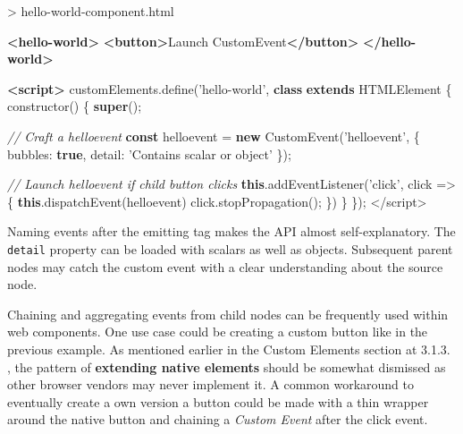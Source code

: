 \documentclass[]{article}
\newenvironment{Shaded}{}{}
\newcommand{\KeywordTok}[1]{\textcolor[rgb]{0.00,0.44,0.13}{\textbf{{#1}}}}
\newcommand{\DataTypeTok}[1]{\textcolor[rgb]{0.56,0.13,0.00}{{#1}}}
\newcommand{\StringTok}[1]{\textcolor[rgb]{0.25,0.44,0.63}{{#1}}}
\newcommand{\SpecialStringTok}[1]{\textcolor[rgb]{0.73,0.40,0.53}{{#1}}}
\newcommand{\CommentTok}[1]{\textcolor[rgb]{0.38,0.63,0.69}{\textit{{#1}}}}
\newcommand{\VariableTok}[1]{\textcolor[rgb]{0.10,0.09,0.49}{{#1}}}
\newcommand{\OperatorTok}[1]{\textcolor[rgb]{0.40,0.40,0.40}{{#1}}}
\newcommand{\AttributeTok}[1]{\textcolor[rgb]{0.49,0.56,0.16}{{#1}}}
\newcommand{\NormalTok}[1]{{#1}}
\begin{document}
\begin{Shaded}
\begin{Highlighting}[]
\NormalTok{> hello-world-component.html}

\KeywordTok{<hello-world>}
 \KeywordTok{<button>}\NormalTok{Launch CustomEvent}\KeywordTok{</button>}
\KeywordTok{</hello-world>}

\KeywordTok{<script>}
 \VariableTok{customElements}\NormalTok{.}\AttributeTok{define}\NormalTok{(}\StringTok{'hello-world'}\OperatorTok{,} 
 \KeywordTok{class} \KeywordTok{extends} \NormalTok{HTMLElement }\OperatorTok{\{}
  \AttributeTok{constructor}\NormalTok{() }\OperatorTok{\{}
    \KeywordTok{super}\NormalTok{()}\OperatorTok{;}
   
   \CommentTok{// Craft a helloevent}
    \KeywordTok{const} \NormalTok{helloevent }\OperatorTok{=} \KeywordTok{new} \AttributeTok{CustomEvent}\NormalTok{(}\StringTok{'helloevent'}\OperatorTok{,} \OperatorTok{\{}
    \DataTypeTok{bubbles}\OperatorTok{:} \KeywordTok{true}\OperatorTok{,}
    \DataTypeTok{detail}\OperatorTok{:} \StringTok{'Contains scalar or object'}
   \OperatorTok{\}}\NormalTok{)}\OperatorTok{;}
   
   \CommentTok{// Launch helloevent if child button clicks}
   \KeywordTok{this}\NormalTok{.}\AttributeTok{addEventListener}\NormalTok{(}\StringTok{'click'}\OperatorTok{,} \NormalTok{click }\OperatorTok{=>} \OperatorTok{\{}
    \KeywordTok{this}\NormalTok{.}\AttributeTok{dispatchEvent}\NormalTok{(helloevent)}
    \VariableTok{click}\NormalTok{.}\AttributeTok{stopPropagation}\NormalTok{()}\OperatorTok{;}
   \OperatorTok{\}}\NormalTok{)}
  \OperatorTok{\}}
 \OperatorTok{\}}\NormalTok{)}\OperatorTok{;}
\OperatorTok{<}\SpecialStringTok{/script>}
\end{Highlighting}
\end{Shaded}

Naming events after the emitting tag makes the API almost
self-explanatory. The \texttt{detail} property can be loaded with
scalars as well as objects. Subsequent parent nodes may catch the custom
event with a clear understanding about the source node.

Chaining and aggregating events from child nodes can be frequently used
within web components. One use case could be creating a custom button
like in the previous example. As mentioned earlier in the Custom
Elements section at 3.1.3. , the pattern of \textbf{extending native
elements} should be somewhat dismissed as other browser vendors may
never implement it. A common workaround to eventually create a own
version a button could be made with a thin wrapper around the native
button and chaining a \emph{Custom Event} after the click event.
\end{document}
